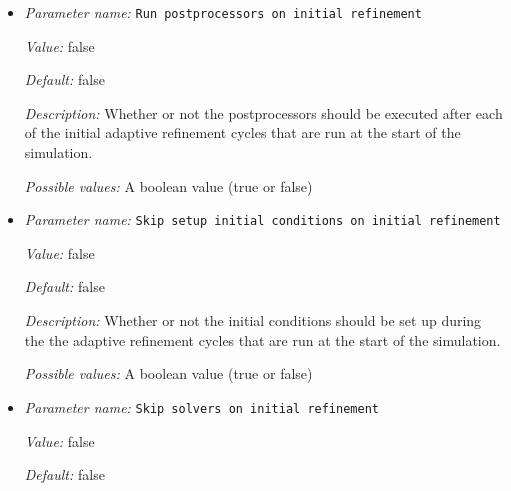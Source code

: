 \begin{itemize}
{\it Default:} 0.3


{\it Description:} The fraction of cells with the largest error that should be flagged for refinement.


{\it Possible values:} A floating point number $v$ such that $0 \leq v \leq 1$
\item {\it Parameter name:} {\tt Run postprocessors on initial refinement}
\label{parameters:Mesh refinement/Run postprocessors on initial refinement}
\label{parameters:Mesh_20refinement/Run_20postprocessors_20on_20initial_20refinement}


{\it Value:} false


{\it Default:} false


{\it Description:} Whether or not the postprocessors should be executed after each of the initial adaptive refinement cycles that are run at the start of the simulation.


{\it Possible values:} A boolean value (true or false)
\item {\it Parameter name:} {\tt Skip setup initial conditions on initial refinement}
\label{parameters:Mesh refinement/Skip setup initial conditions on initial refinement}
\label{parameters:Mesh_20refinement/Skip_20setup_20initial_20conditions_20on_20initial_20refinement}


{\it Value:} false


{\it Default:} false


{\it Description:} Whether or not the initial conditions should be set up during the the adaptive refinement cycles that are run at the start of the simulation.


{\it Possible values:} A boolean value (true or false)
\item {\it Parameter name:} {\tt Skip solvers on initial refinement}
\label{parameters:Mesh refinement/Skip solvers on initial refinement}
\label{parameters:Mesh_20refinement/Skip_20solvers_20on_20initial_20refinement}


{\it Value:} false


{\it Default:} false



\end{itemize}
